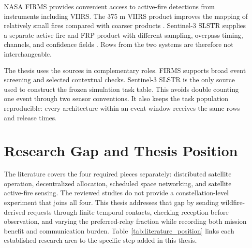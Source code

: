 NASA FIRMS provides convenient access to active-fire detections from instruments including VIIRS. The 375 m VIIRS product improves the mapping of relatively small fires compared with coarser products \citep{Schroeder2014}. Sentinel-3 SLSTR supplies a separate active-fire and FRP product with different sampling, overpass timing, channels, and confidence fields \citep{WoosterSLSTR2012,XuWooster2023}. Rows from the two systems are therefore not interchangeable.

The thesis uses the sources in complementary roles. FIRMS supports broad event screening and selected contextual checks. Sentinel-3 SLSTR is the only source used to construct the frozen simulation task table. This avoids double counting one event through two sensor conventions. It also keeps the task population reproducible: every architecture within an event window receives the same rows and release times.

\section{Research Gap and Thesis Position}
The literature covers the four required pieces separately: distributed satellite operation, decentralized allocation, scheduled space networking, and satellite active-fire sensing. The reviewed studies do not provide a constellation-level experiment that joins all four. This thesis addresses that gap by sending wildfire-derived requests through finite temporal contacts, checking reception before observation, and varying the preferred-relay fraction while recording both mission benefit and communication burden. Table~\ref{tab:literature_position} links each established research area to the specific step added in this thesis.

